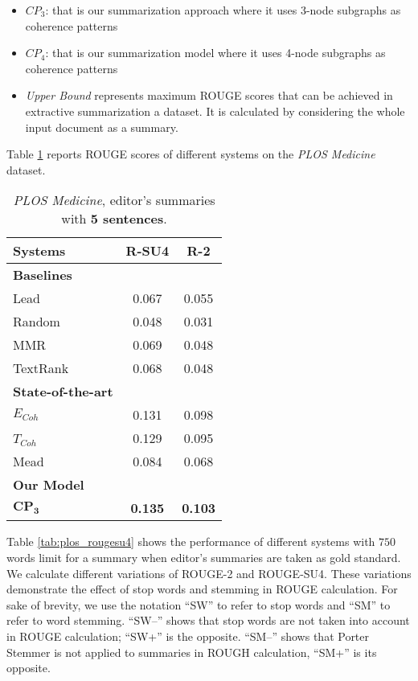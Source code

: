 \begin{itemize}
	\item \emph{$CP_3$}: that is our summarization approach where it uses \mbox{3-node} subgraphs as coherence patterns

	\item \emph{$CP_4$}: that is our summarization model where it uses \mbox{4-node} subgraphs as coherence patterns

	\item  \emph{Upper Bound} represents maximum ROUGE scores
	that can be achieved in extractive summarization a dataset. 
	It is calculated by considering the whole input document as a summary.
	
\end{itemize}


Table \ref{table:plos_5len_editor} reports ROUGE scores of different systems on the \emph{PLOS Medicine} dataset. 
%
\begin{table}[!ht]
\centering
\small
\begin{tabular}{@{}l|c|c@{}}
\hline
Systems & R-SU4 & R-2\\
\hline
\textbf{Baselines}&  & \\
Lead & 0.067 &  0.055  \\
Random &  0.048  & 0.031  \\
MMR & 0.069 &  0.048  \\
TextRank & 0.068  & 0.048  \\
\textbf{State-of-the-art}&  & \\\hline
$E_{Coh}$ & 0.131& 0.098 \\
$T_{Coh}$\ & 0.129 & 0.095  \\
Mead & 0.084 & 0.068 \\
\textbf{Our Model} & & \\\hline
$\mathbf{CP_3}$ & \textbf{0.135} & \textbf{0.103} \\
\hline
\end{tabular}
\caption{\emph{PLOS Medicine}, editor's summaries with \textbf{5 sentences}.}
\label{table:plos_5len_editor}
\end{table}



Table \ref{tab:plos_rougesu4} shows the performance of different systems with $750$ words limit for a summary when editor's summaries are taken as gold standard. 
We calculate different variations of ROUGE-2 and ROUGE-SU4. 
These variations demonstrate the effect of stop words and stemming in ROUGE calculation.
For sake of brevity, we use the notation ``SW'' to refer to stop words and ``SM'' to refer to word stemming.  
``SW--'' shows that stop words are not taken into account in ROUGE calculation; ``SW+'' is the opposite. 
``SM--'' shows that Porter Stemmer is not applied to summaries in ROUGH calculation, ``SM+'' is its opposite. 
 
